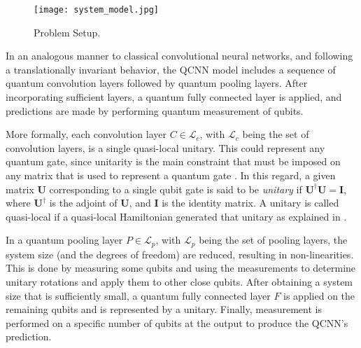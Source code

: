 \documentclass{article}
\begin{document}
\begin{figure}[t]
  \begin{center}
    \texttt{[image: system\_model.jpg]}
    \caption{Problem Setup.}\label{fig_problem_setup}
  \end{center}
\end{figure}

In an analogous manner to classical convolutional neural networks, and following a translationally invariant behavior, the QCNN model includes a sequence of quantum convolution layers followed by quantum pooling layers. After incorporating sufficient layers, a quantum fully connected layer is applied, and predictions are made by performing quantum measurement of qubits. 

More formally, each convolution layer $C \in \mathcal{L}_c$, with $\mathcal{L}_c$ being the set of convolution layers, is a single quasi-local unitary. This could represent any quantum gate, since unitarity is the main constraint that must be imposed on any matrix that is used to represent a quantum gate \cite{nielsen_book}. In this regard, a given matrix $\boldsymbol{U}$ corresponding to a single qubit gate is said to be \emph{unitary} if $\boldsymbol{U}^\dagger \boldsymbol{U} = \boldsymbol{I}$, where $\boldsymbol{U}^\dagger$ is the adjoint of $\boldsymbol{U}$, and $\boldsymbol{I}$ is the identity matrix. A unitary is called quasi-local if a quasi-local Hamiltonian generated that unitary as explained in \cite{quasi_local_unitary}. 

In a quantum pooling layer $P \in \mathcal{L}_p$, with $\mathcal{L}_p$ being the set of pooling layers, the system size (and the degrees of freedom) are reduced, resulting in non-linearities. This is done by measuring some qubits and using the measurements to determine unitary rotations and apply them to other close qubits. After obtaining a system size that is sufficiently small, a quantum fully connected layer $F$ is applied on the remaining qubits and is represented by a unitary. Finally, measurement is performed on a specific number of qubits at the output to produce the QCNN's prediction.
\end{document}
